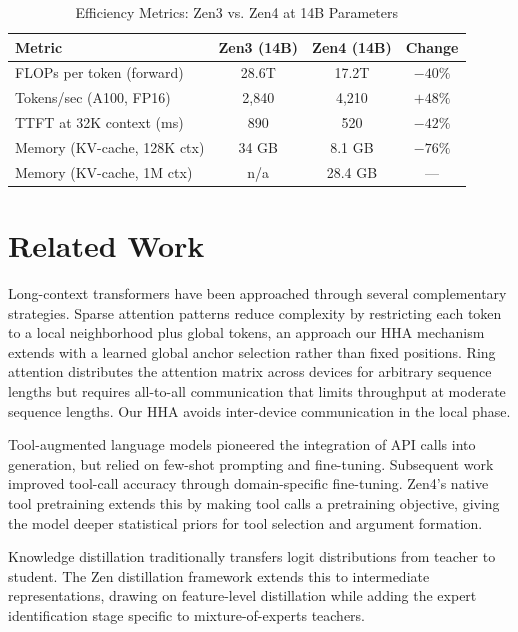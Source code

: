 \documentclass[11pt,a4paper]{article}
\begin{document}
\begin{table}[H]
\centering
\begin{tabular}{lccc}
\toprule
\textbf{Metric} & \textbf{Zen3 (14B)} & \textbf{Zen4 (14B)} & \textbf{Change} \\
\midrule
FLOPs per token (forward)     & 28.6T & 17.2T & $-40\%$ \\
Tokens/sec (A100, FP16)       & 2,840 & 4,210 & $+48\%$ \\
TTFT at 32K context (ms)      & 890   & 520   & $-42\%$ \\
Memory (KV-cache, 128K ctx)   & 34 GB & 8.1 GB & $-76\%$ \\
Memory (KV-cache, 1M ctx)     & n/a   & 28.4 GB & --- \\
\bottomrule
\end{tabular}
\caption{Efficiency Metrics: Zen3 vs. Zen4 at 14B Parameters}
\end{table}

\section{Related Work}

Long-context transformers have been approached through several complementary strategies.
Sparse attention patterns \cite{beltagy2020longformer} reduce complexity by restricting
each token to a local neighborhood plus global tokens, an approach our HHA mechanism
extends with a learned global anchor selection rather than fixed positions. Ring attention
\cite{liu2023ring} distributes the attention matrix across devices for arbitrary sequence
lengths but requires all-to-all communication that limits throughput at moderate sequence
lengths. Our HHA avoids inter-device communication in the local phase.

Tool-augmented language models \cite{schick2023toolformer} pioneered the integration of
API calls into generation, but relied on few-shot prompting and fine-tuning. Subsequent
work \cite{patil2023gorilla} improved tool-call accuracy through domain-specific fine-tuning.
Zen4's native tool pretraining extends this by making tool calls a pretraining objective,
giving the model deeper statistical priors for tool selection and argument formation.

Knowledge distillation \cite{hinton2015distilling} traditionally transfers logit distributions
from teacher to student. The Zen distillation framework extends this to intermediate representations,
drawing on feature-level distillation \cite{romero2014fitnets} while adding the expert
identification stage specific to mixture-of-experts teachers.
\end{document}
